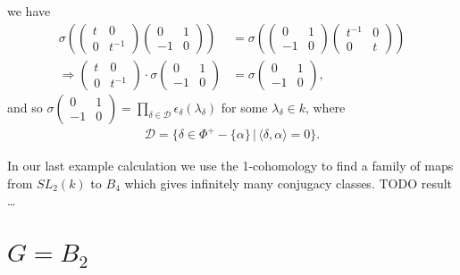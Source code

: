 we have
\begin{align*}
	\sigma\left(
		\left(\begin{matrix}t & 0\\0 & t^{-1}\end{matrix}\right)
		\left(\begin{matrix}0 & 1\\-1 & 0\end{matrix}\right)
	\right) &= 
	\sigma\left(
		\left(\begin{matrix}0 & 1\\-1 & 0\end{matrix}\right)
		\left(\begin{matrix}t^{-1} & 0\\0 & t\end{matrix}\right)
	\right) \\
	\Rightarrow
		\left(\begin{matrix}t & 0\\0 & t^{-1}\end{matrix}\right)\cdot
		\sigma\left(\begin{matrix}0 & 1\\-1 & 0\end{matrix}\right)
	 &= 
	\sigma
		\left(\begin{matrix}0 & 1\\-1 & 0\end{matrix}\right),
\end{align*}
and so $\sigma\left(\begin{matrix}0 & 1\\-1 & 0\end{matrix}\right) = \prod_{\delta\in\mathcal{D}} \epsilon_\delta(\lambda_\delta)$ for some $\lambda_\delta\in k$, where
\begin{align*}
	\mathcal{D} = \{\delta\in \Phi^+-\{\alpha\}\,|\,\langle\delta,\alpha\rangle = 0\}.
\end{align*}



	In our last example calculation we use the 1-cohomology to find a family of maps from $SL_2(k)$ to $B_4$ which gives infinitely many conjugacy classes. TODO result \ldots


\section{$G = B_2$}
\label{b2}

